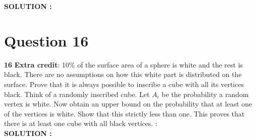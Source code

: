 \documentclass{article}
\begin{document}
\hspace{1em} \large{\textbf{SOLUTION :}} \\

\section{Question 16}
\label{Q16}
\textbf{16} \textbf{Extra credit}: 10\% of the surface area of a sphere is white and the rest is black. There are no assumptions on how this white part is distributed on the surface. Prove that it is always possible to inscribe a cube with all its vertices black. Think of a randomly inscribed cube. Let $A_i$ be the probability a random vertex is white. Now obtain an upper bound on the probability that at least one of the vertices is white. Show that this strictly less than one. This proves that there is at least one cube with all black vertices.
 : \\

\hspace{1em} \large{\textbf{SOLUTION :}} \\
\end{document}
